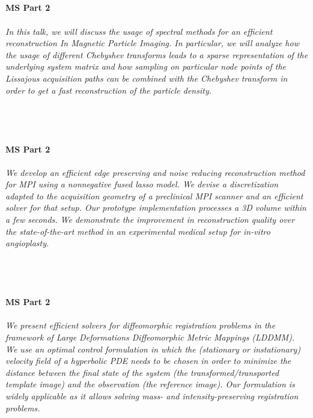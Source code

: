 \begin{multicols}{2}
\\ 
    \\
    \\\\
    \noindent\textbf{MS Part 2}\\
\\  
    \textit{In this talk, we will discuss the usage of spectral methods for an efficient reconstruction In Magnetic Particle Imaging. In particular, we will analyze how the usage of different Chebyshev transforms leads to a sparse representation of the underlying system matrix and how sampling on particular node points of the Lissajous acquisition paths can be combined with the Chebyshev transform in order to get a fast reconstruction of the particle density.}\\
\\ 
    \\
    \\\\
    \noindent\textbf{MS Part 2}\\
\\  
    \textit{We develop an efficient edge preserving and noise reducing reconstruction method for MPI using a nonnegative fused lasso model. We devise a discretization adapted to the acquisition geometry of a preclinical MPI scanner and an efficient solver for that setup. Our prototype implementation processes a 3D volume within a few seconds. We demonstrate the improvement in reconstruction quality over the state-of-the-art method in an experimental medical setup for in-vitro angioplasty.}\\
\\ 
    \\
    \\\\
    \noindent\textbf{MS Part 2}\\
\\  
    \textit{We present efficient solvers for diffeomorphic registration problems in the framework of Large Deformations Diffeomorphic Metric Mappings (LDDMM). We use an optimal control formulation in which the (stationary or instationary) velocity field of a hyperbolic PDE needs to be chosen in order to minimize the distance between the final state of the system (the transformed/transported template image) and the observation (the reference image). Our formulation is widely applicable as it allows solving mass- and intensity-preserving registration problems.}\\

\end{multicols}
